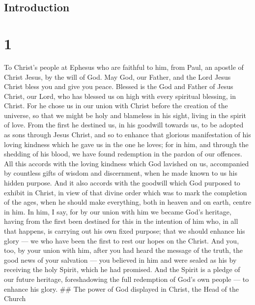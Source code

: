\hypertarget{introduction}{%
\subsection{Introduction}\label{introduction}}

\hypertarget{section}{%
\section{1}\label{section}}

 To Christ's people at Ephesus who are faithful to him, from
Paul, an apostle of Christ Jesus, by the will of God.  May
God, our Father, and the Lord Jesus Christ bless you and give you peace.
 Blessed is the God and Father of Jesus Christ, our Lord,
who has blessed us on high with every spiritual blessing, in Christ.
 For he chose us in our union with Christ before the
creation of the universe, so that we might be holy and blameless in his
sight, living in the spirit of love.  From the first he
destined us, in his goodwill towards us, to be adopted as sons through
Jesus Christ,  and so to enhance that glorious manifestation
of his loving kindness which he gave us in the one he loves;
 for in him, and through the shedding of his blood, we have
found redemption in the pardon of our offences.  All this
accords with the loving kindness which God lavished on us, accompanied
by countless gifts of wisdom and discernment,  when he made
known to us his hidden purpose. And it also accords with the goodwill
which God purposed to exhibit in Christ,  in view of that
divine order which was to mark the completion of the ages, when he
should make everything, both in heaven and on earth, centre in him.
 In him, I say, for by our union with him we became God's
heritage, having from the first been destined for this in the intention
of him who, in all that happens, is carrying out his own fixed purpose;
 that we should enhance his glory --- we who have been the
first to rest our hopes on the Christ.  And you, too, by
your union with him, after you had heard the message of the truth, the
good news of your salvation --- you believed in him and were sealed as
his by receiving the holy Spirit, which he had promised. 
And the Spirit is a pledge of our future heritage, foreshadowing the
full redemption of God's own people --- to enhance his glory. \#\# The
power of God displayed in Christ, the Head of the Church

